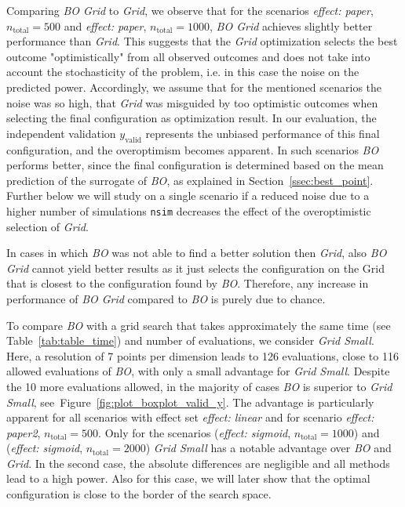 \documentclass[bimj,fleqn]{w-art}
\theoremstyle{plain}
\theoremstyle{definition}
\begin{document}
Comparing \emph{BO Grid} to \emph{Grid}, we observe that for the scenarios \emph{effect: paper}, $n_{\text{total}} = 500$ and \emph{effect: paper}, $n_{\text{total}} = 1000$, \emph{BO Grid} achieves slightly better performance than \emph{Grid}.
This suggests that the \emph{Grid} optimization selects the best outcome "optimistically" from all observed outcomes and does not take into account the stochasticity of the problem, i.e. in this case the noise on the predicted power. 
Accordingly, we assume that for the mentioned scenarios the noise was so high, that \emph{Grid} was misguided by too optimistic outcomes when selecting the final configuration as optimization result.
In our evaluation, the independent validation $y_{\text{valid}}$ represents the unbiased performance of this final configuration, and the overoptimism becomes apparent.
In such scenarios \emph{BO} performs better, since the final configuration is determined based on the mean prediction of the surrogate of \emph{BO}, as explained in Section~\ref{ssec:best_point}.
Further below we will study on a single scenario if a reduced noise due to a higher number of simulations \texttt{nsim} decreases the effect of the overoptimistic selection of \emph{Grid}.

In cases in which \emph{BO} was not able to find a better solution then \emph{Grid}, also \emph{BO Grid} cannot yield better results as it just selects the configuration on the Grid that is closest to the configuration found by \emph{BO}.
Therefore, any increase in performance of \emph{BO Grid} compared to \emph{BO} is purely due to chance.

To compare \emph{BO} with a grid search that takes approximately the same time (see Table~\ref{tab:table_time}) and number of evaluations, we consider \emph{Grid Small}.
Here, a resolution of 7 points per dimension leads to 126 evaluations, close to 116 allowed evaluations of \emph{BO}, with only a small advantage for \emph{Grid Small}.
Despite the 10 more evaluations allowed, in the majority of cases \emph{BO} is superior to \emph{Grid Small}, see~Figure~\ref{fig:plot_boxplot_valid_y}.
The advantage is particularly apparent for all scenarios with effect set \emph{effect: linear} and for scenario \emph{effect: paper2}, $n_{\text{total}} = 500$.
Only for the scenarios (\emph{effect: sigmoid}, $n_{\text{total}} = 1000$) and (\emph{effect: sigmoid}, $n_{\text{total}} = 2000$) \emph{Grid Small} has a notable advantage over \emph{BO} and \emph{Grid}.
In the second case, the absolute differences are negligible and all methods lead to a high power.
Also for this case, we will later show that the optimal configuration is close to the border of the search space.
\end{document}
